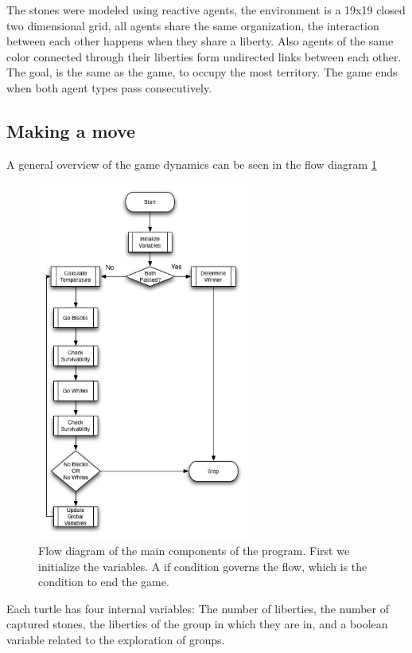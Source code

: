 \documentclass[a4paper,10pt,twocolumn]{article}
\begin{document}
\begin{CJK*}{UTF8}{gbsn}
The stones were modeled using reactive agents, the environment is a 19x19 closed two dimensional grid, all agents share the same organization, the interaction between each other happens when they share a liberty. Also agents of the same color connected through their liberties form undirected links between each other.  The goal, is the same as the game, to occupy the most territory.  The game ends when both agent types pass consecutively. 

\subsection{Making a move}
A general overview of the game dynamics can be seen in the flow diagram \ref{d1}

\begin{figure}[!ht]
\begin{center}
\includegraphics[width=7cm]{df.png}
\caption{\footnotesize {Flow diagram of the main components of the program.} First we initialize the variables. A if condition governs the flow, which is the condition to end the game.  \label{d1}}
\end{center}
\end{figure}

Each turtle has four internal variables: The number of liberties, the number of captured stones, the liberties of the group in which they are in, and a boolean variable related to the exploration of groups. 
 

\end{CJK*}
\end{document}
